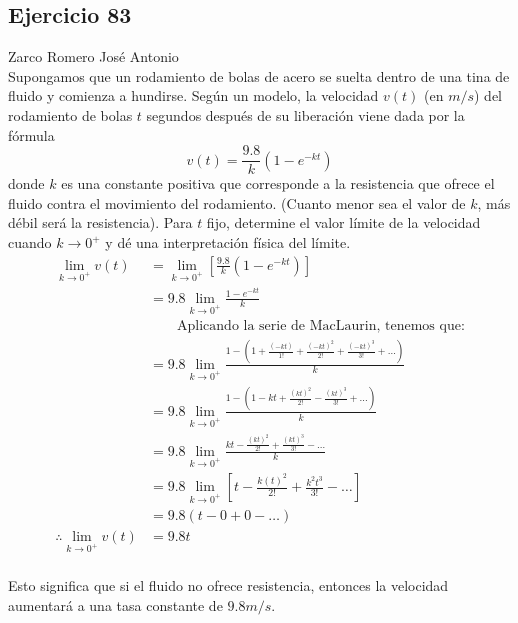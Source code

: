\documentclass[12pt]{article}
\begin{document}
\subsection{Ejercicio 83} Zarco Romero José Antonio \\

Supongamos que un rodamiento  de bolas de acero se suelta dentro de una tina de fluido y comienza a hundirse. Según un modelo, la velocidad $v(t)$ (en $m/s$) del rodamiento de bolas $t$ segundos después de su liberación viene dada por la fórmula
\[
v(t)=\frac{9.8}{k}(1-e^{-kt})
\]
donde $k$ es una constante positiva que corresponde a la resistencia que ofrece el fluido contra el movimiento del rodamiento. (Cuanto menor sea el valor de $k$, más débil será la resistencia).
Para $t$ fijo, determine el valor límite de la velocidad cuando $k\rightarrow 0^+$ y dé una interpretación física del límite.
\[ \begin{equation*}
  \begin{split}
    \lim_{k \to 0^+} v(t)
    &= \lim_{k \to 0^+} \left[ \frac{9.8}{k}(1-e^{-kt}) \right] \\
    &= 9.8 \lim_{k \to 0^+} \frac{1-e^{-kt}}{k} \\
    & \qquad \text{Aplicando la serie de MacLaurin, tenemos que:} \\
    &= 9.8 \lim_{k \to 0^+} \frac{1-
      \left(1+\frac{(-kt)}{1!}+\frac{(-kt)^2}{2!}+\frac{(-kt)^3}{3!}+\ldots \right)
    }{k} \\
    &= 9.8 \lim_{k \to 0^+} \frac{1-
      \left(1-kt+\frac{(kt)^2}{2!}-\frac{(kt)^3}{3!}+\ldots \right)
    }{k} \\
    &= 9.8 \lim_{k \to 0^+} \frac{kt-\frac{(kt)^2}{2!}+\frac{(kt)^3}{3!}-\ldots}{k} \\
    &= 9.8 \lim_{k \to 0^+} \left[ t-\frac{k(t)^2}{2!}+\frac{k^2t^3}{3!}-\ldots \right] \\
    &= 9.8 ( t-0+0-\ldots ) \\
    \therefore
    \lim_{k \to 0^+} v(t)
    &= 9.8 t \\
  \end{split}
\end{equation*} \]

Esto significa que si el fluido no ofrece resistencia, entonces la velocidad aumentará a una tasa constante de $9.8 m/s$.

\end{document}
